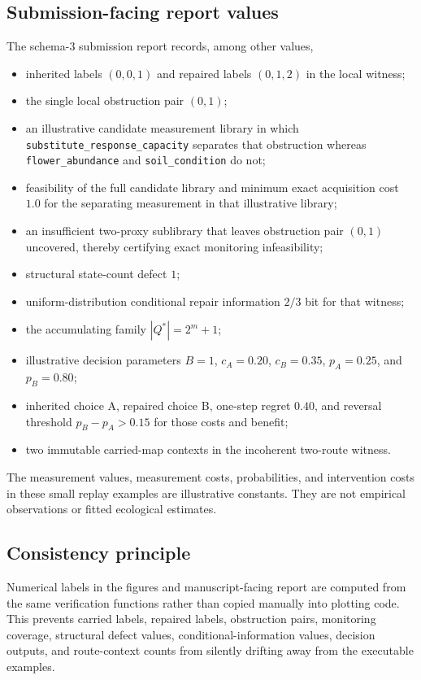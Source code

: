\subsection{Submission-facing report values}
The schema-3 submission report records, among other values,
\begin{itemize}
\item inherited labels $(0,0,1)$ and repaired labels $(0,1,2)$ in the local witness;
\item the single local obstruction pair $(0,1)$;
\item an illustrative candidate measurement library in which \texttt{substitute\_response\_capacity} separates that obstruction whereas \texttt{flower\_abundance} and \texttt{soil\_condition} do not;
\item feasibility of the full candidate library and minimum exact acquisition cost $1.0$ for the separating measurement in that illustrative library;
\item an insufficient two-proxy sublibrary that leaves obstruction pair $(0,1)$ uncovered, thereby certifying exact monitoring infeasibility;
\item structural state-count defect $1$;
\item uniform-distribution conditional repair information $2/3$ bit for that witness;
\item the accumulating family $|Q^\ast|=2^m+1$;
\item illustrative decision parameters $B=1$, $c_A=0.20$, $c_B=0.35$, $p_A=0.25$, and $p_B=0.80$;
\item inherited choice A, repaired choice B, one-step regret $0.40$, and reversal threshold $p_B-p_A>0.15$ for those costs and benefit;
\item two immutable carried-map contexts in the incoherent two-route witness.
\end{itemize}
The measurement values, measurement costs, probabilities, and intervention costs in these small replay examples are illustrative constants. They are not empirical observations or fitted ecological estimates.

\subsection{Consistency principle}
Numerical labels in the figures and manuscript-facing report are computed from the same verification functions rather than copied manually into plotting code. This prevents carried labels, repaired labels, obstruction pairs, monitoring coverage, structural defect values, conditional-information values, decision outputs, and route-context counts from silently drifting away from the executable examples.

